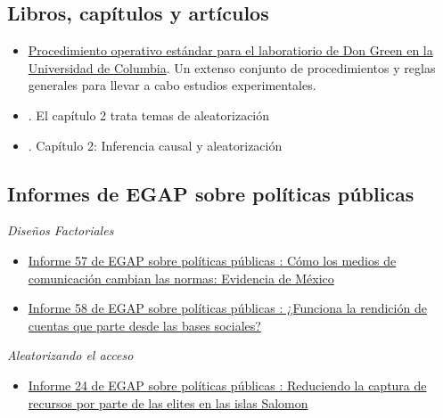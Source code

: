 \documentclass[
  12pt,
  spanish,
]{book}
\providecommand{\tightlist}{%
  \setlength{\itemsep}{0pt}\setlength{\parskip}{0pt}}
\begin{document}
\hypertarget{libros-capuxedtulos-y-artuxedculos-1}{%
\subsection{Libros, capítulos y artículos}\label{libros-capuxedtulos-y-artuxedculos-1}}

\begin{itemize}
\item
  \href{https://github.com/acoppock/Green-Lab-SOP}{Procedimiento operativo estándar para el laboratiorio de Don Green en la Universidad de Columbia}. Un extenso conjunto de procedimientos y reglas generales para llevar a cabo estudios experimentales.
\item
  \autocite{glennerster_running_2013}. El capítulo 2 trata temas de aleatorización
\item
  \autocite{gerber_field_2012}. Capítulo 2: Inferencia causal y aleatorización
\end{itemize}

\hypertarget{informes-de-egap-sobre-poluxedticas-puxfablicas-1}{%
\subsection{Informes de EGAP sobre políticas públicas}\label{informes-de-egap-sobre-poluxedticas-puxfablicas-1}}

\emph{Diseños Factoriales}

\begin{itemize}
\item
  \href{https://egap.org/resource/how-media-influence-social-norms-evidence-from-mexico/}{Informe 57 de EGAP sobre políticas públicas : Cómo los medios de comunicación cambian las normas: Evidencia de México}
\item
  \href{https://egap.org/resource/does-bottom-up-accountability-work-evidence-from-uganda/}{Informe 58 de EGAP sobre políticas públicas : ¿Funciona la rendición de cuentas que parte desde las bases sociales?}
\end{itemize}

\emph{Aleatorizando el acceso}

\begin{itemize}
\tightlist
\item
  \href{https://egap.org/resource/brief-24-reducing-elite-capture-in-the-solomon-islands/}{Informe 24 de EGAP sobre políticas públicas : Reduciendo la captura de recursos por parte de las elites en las islas Salomon}
\end{itemize}
\end{document}
